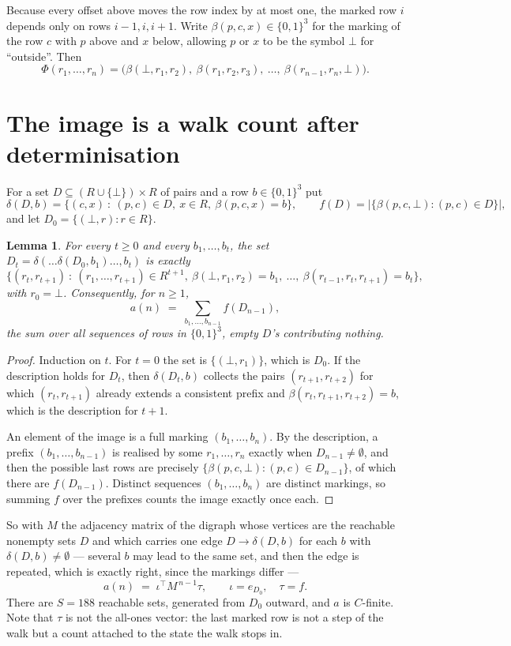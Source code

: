 \documentclass[11pt,a4paper]{article}
\theoremstyle{plain}
\newtheorem{lemma}[theorem]{Lemma}
\theoremstyle{definition}
\begin{document}
Because every offset above moves the row index by at most one, the marked row $i$ depends only
on rows $i-1,i,i+1$. Write $\beta(p,c,x)\in\{0,1\}^{3}$ for the marking of the row $c$
with $p$ above and $x$ below, allowing $p$ or $x$ to be the symbol $\bot$ for ``outside''.
Then
\[
\Phi(r_1,\dots,r_n)=\bigl(\beta(\bot,r_1,r_2),\ \beta(r_1,r_2,r_3),\ \dots,\
\beta(r_{n-1},r_n,\bot)\bigr).
\]

\section{The image is a walk count after determinisation}

For a set $D\subseteq(R\cup\{\bot\})\times R$ of pairs and a row $b\in\{0,1\}^{3}$ put
\[
\delta(D,b)=\{(c,x)\ :\ (p,c)\in D,\ x\in R,\ \beta(p,c,x)=b\},\qquad
f(D)=\bigl|\{\beta(p,c,\bot):(p,c)\in D\}\bigr| ,
\]
and let $D_0=\{(\bot,r):r\in R\}$.

\begin{lemma}\label{lem:det}
For every $t\ge0$ and every $b_1,\dots,b_t$, the set
$D_t=\delta(\dots\delta(D_0,b_1)\dots,b_t)$ is exactly
\[
\{(r_t,r_{t+1})\ :\ (r_1,\dots,r_{t+1})\in R^{t+1},\ \beta(\bot,r_1,r_2)=b_1,\ \dots,\
\beta(r_{t-1},r_t,r_{t+1})=b_t\} ,
\]
with $r_0=\bot$. Consequently, for $n\ge1$,
\[
a(n)\;=\;\sum_{b_1,\dots,b_{n-1}}f(D_{n-1}),
\]
the sum over all sequences of rows in $\{0,1\}^{3}$, empty $D$'s contributing nothing.
\end{lemma}

\begin{proof}
Induction on $t$. For $t=0$ the set is $\{(\bot,r_1)\}$, which is $D_0$. If the description
holds for $D_t$, then $\delta(D_t,b)$ collects the pairs $(r_{t+1},r_{t+2})$ for which
$(r_t,r_{t+1})$ already extends a consistent prefix and
$\beta(r_t,r_{t+1},r_{t+2})=b$, which is the description for $t+1$.

An element of the image is a full marking $(b_1,\dots,b_n)$. By the description, a prefix
$(b_1,\dots,b_{n-1})$ is realised by some $r_1,\dots,r_n$ exactly when $D_{n-1}\neq
\emptyset$, and then the possible last rows are precisely
$\{\beta(p,c,\bot):(p,c)\in D_{n-1}\}$, of which there are $f(D_{n-1})$. Distinct
sequences $(b_1,\dots,b_n)$ are distinct markings, so summing $f$ over the prefixes counts the
image exactly once each.
\end{proof}

So with $M$ the adjacency matrix of the digraph whose vertices are the reachable nonempty sets
$D$ and which carries one edge $D\to\delta(D,b)$ for each $b$ with $\delta(D,b)\neq\emptyset$
--- several $b$ may lead to the same set, and then the edge is repeated, which is exactly
right, since the markings differ ---
\[
a(n)\;=\;\iota^{\!\top}M^{\,n-1}\tau,\qquad \iota=e_{D_0},\quad \tau=f .
\]
There are $S=188$ reachable sets, generated from $D_0$ outward, and $a$ is $C$-finite. Note
that $\tau$ is not the all-ones vector: the last marked row is not a step of the walk but a
count attached to the state the walk stops in.
\end{document}
